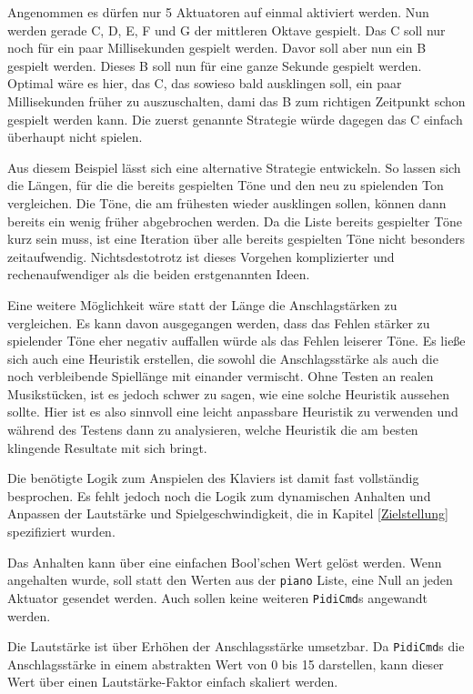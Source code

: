 Angenommen es dürfen nur 5 Aktuatoren auf einmal aktiviert werden.
Nun werden gerade C, D, E, F und G der mittleren Oktave gespielt.
Das C soll nur noch für ein paar Millisekunden gespielt werden.
Davor soll aber nun ein B gespielt werden.
Dieses B soll nun für eine ganze Sekunde gespielt werden.
Optimal wäre es hier, das C, das sowieso bald ausklingen soll, ein paar Millisekunden früher zu auszuschalten, dami das B zum richtigen Zeitpunkt schon gespielt werden kann.
Die zuerst genannte Strategie würde dagegen das C einfach überhaupt nicht spielen.

Aus diesem Beispiel lässt sich eine alternative Strategie entwickeln.
So lassen sich die Längen, für die die bereits gespielten Töne und den neu zu spielenden Ton vergleichen.
Die Töne, die am frühesten wieder ausklingen sollen, können dann bereits ein wenig früher abgebrochen werden.
Da die Liste bereits gespielter Töne kurz sein muss, ist eine Iteration über alle bereits gespielten Töne nicht besonders zeitaufwendig.
Nichtsdestotrotz ist dieses Vorgehen komplizierter und rechenaufwendiger als die beiden erstgenannten Ideen.

Eine weitere Möglichkeit wäre statt der Länge die Anschlagstärken zu vergleichen.
Es kann davon ausgegangen werden, dass das Fehlen stärker zu spielender Töne eher negativ auffallen würde als das Fehlen leiserer Töne.
Es ließe sich auch eine Heuristik erstellen, die sowohl die Anschlagsstärke als auch die noch verbleibende Spiellänge mit einander vermischt.
Ohne Testen an realen Musikstücken, ist es jedoch schwer zu sagen, wie eine solche Heuristik aussehen sollte.
Hier ist es also sinnvoll eine leicht anpassbare Heuristik zu verwenden und während des Testens dann zu analysieren, welche Heuristik die am besten klingende Resultate mit sich bringt.

Die benötigte Logik zum Anspielen des Klaviers ist damit fast vollständig besprochen.
Es fehlt jedoch noch die Logik zum dynamischen Anhalten und Anpassen der Lautstärke und Spielgeschwindigkeit, die in Kapitel \ref{Zielstellung} spezifiziert wurden.

Das Anhalten kann über eine einfachen Bool'schen Wert gelöst werden.
Wenn angehalten wurde, soll statt den Werten aus der \lstinline{piano} Liste, eine Null an jeden Aktuator gesendet werden.
Auch sollen keine weiteren \lstinline{PidiCmd}s angewandt werden.

Die Lautstärke ist über Erhöhen der Anschlagsstärke umsetzbar.
Da \lstinline{PidiCmd}s die Anschlagsstärke in einem abstrakten Wert von 0 bis 15 darstellen, kann dieser Wert über einen Lautstärke-Faktor einfach skaliert werden.

